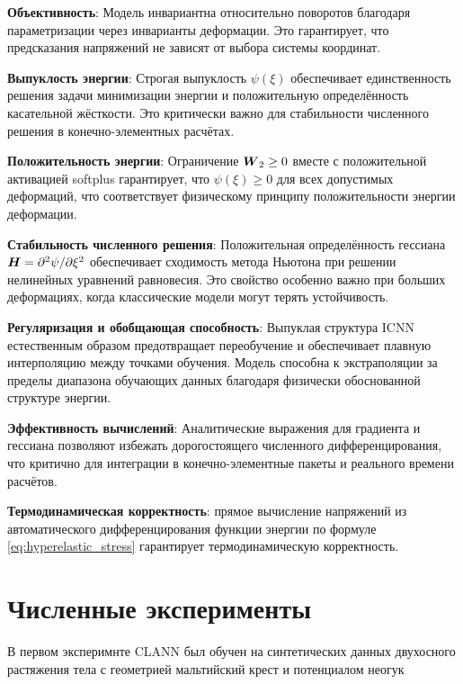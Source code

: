 \textbf{Объективность}: Модель инвариантна относительно поворотов благодаря параметризации через инварианты деформации. Это гарантирует, что предсказания напряжений не зависят от выбора системы координат.

\textbf{Выпуклость энергии}: Строгая выпуклость \(\psi(\xi)\) обеспечивает единственность решения задачи минимизации энергии и положительную определённость касательной жёсткости. Это критически важно для стабильности численного решения в конечно-элементных расчётах.

\textbf{Положительность энергии}: Ограничение \(\boldsymbol{W}_2 \geq 0\) вместе с положительной активацией softplus гарантирует, что \(\psi(\xi) \geq 0\) для всех допустимых деформаций, что соответствует физическому принципу положительности энергии деформации.

\textbf{Стабильность численного решения}: Положительная определённость гессиана \(\boldsymbol{H} = \partial^2\psi/\partial\xi^2\) обеспечивает сходимость метода Ньютона при решении нелинейных уравнений равновесия. Это свойство особенно важно при больших деформациях, когда классические модели могут терять устойчивость.

\textbf{Регуляризация и обобщающая способность}: Выпуклая структура ICNN естественным образом предотвращает переобучение и обеспечивает плавную интерполяцию между точками обучения. Модель способна к экстраполяции за пределы диапазона обучающих данных благодаря физически обоснованной структуре энергии.

\textbf{Эффективность вычислений}: Аналитические выражения для градиента и гессиана позволяют избежать дорогостоящего численного дифференцирования, что критично для интеграции в конечно-элементные пакеты и реального времени расчётов.

\textbf{Термодинамическая корректность}: прямое вычисление напряжений из автоматического дифференцирования функции энергии по формуле \eqref{eq:hyperelastic_stress} гарантирует термодинамическую корректность.

\section{Численные эксперименты}

В первом эксперимнте CLANN был обучен на синтетических данных двухосного растяжения тела с геометрией мальтийский крест и потенциалом неогук 

